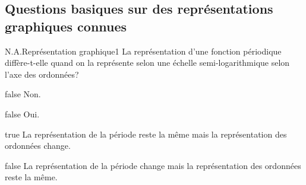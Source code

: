 \documentclass[11pt]{article}
\begin{document}
	\subsection{Questions basiques sur des représentations graphiques connues}
		\begin{question}{N.A.}{Représentation graphique}{1}{}
            La représentation d'une fonction périodique diffère-t-elle quand on la représente selon une échelle semi-logarithmique selon l'axe des ordonnées?
        \end{question}
        \begin{reponses}
            \item[false] Non.
		    \item[false] Oui.
		    \item[true] La représentation de la période reste la même mais la représentation des ordonnées change.
		    \item[false] La représentation de la période change mais la représentation des ordonnées reste la même.
	    \end{reponses}
		
\end{document}
